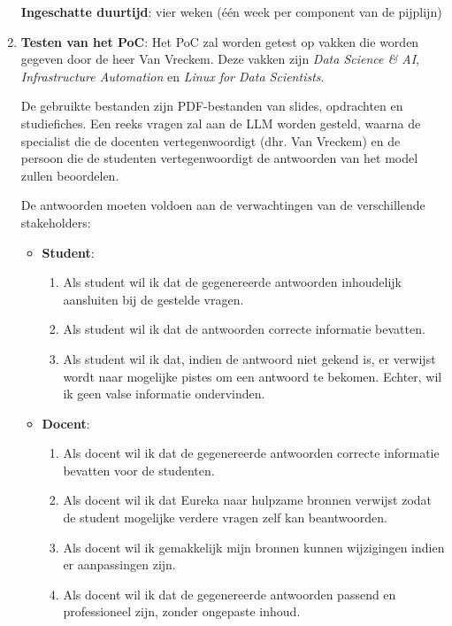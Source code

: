\begin{enumerate}
    \textbf{Ingeschatte duurtijd}: vier weken (één week per component van de pijplijn)
    
    \item \textbf{Testen van het PoC}: Het PoC zal worden getest op vakken die worden gegeven door de heer Van Vreckem. Deze vakken zijn \emph{Data Science \& AI}, \emph{Infrastructure Automation} en \emph{Linux for Data Scientists}.
    
    De gebruikte bestanden zijn PDF-bestanden van slides, opdrachten en studiefiches. Een reeks vragen zal aan de \acrshort{LLM} worden gesteld, waarna de specialist die de docenten vertegenwoordigt (dhr. Van Vreckem) en de persoon die de studenten vertegenwoordigt de antwoorden van het model zullen beoordelen.
    
    De antwoorden moeten voldoen aan de verwachtingen van de verschillende stakeholders:
    
    \begin{itemize} 
        \item \textbf{Student}:
        \begin{enumerate} 
            \item Als student wil ik dat de gegenereerde antwoorden inhoudelijk aansluiten bij de gestelde vragen.
            \item Als student wil ik dat de antwoorden correcte informatie bevatten. 
            \item Als student wil ik dat, indien de antwoord niet gekend is, er verwijst wordt naar mogelijke pistes om een antwoord te bekomen. Echter, wil ik geen valse informatie ondervinden.
        \end{enumerate}
        \item \textbf{Docent}:
        \begin{enumerate} 
            \item Als docent wil ik dat de gegenereerde antwoorden correcte informatie bevatten voor de studenten.
            \item Als docent wil ik dat Eureka naar hulpzame bronnen verwijst zodat de student mogelijke verdere vragen zelf kan beantwoorden. 
            \item Als docent wil ik gemakkelijk mijn bronnen kunnen wijzigingen indien er aanpassingen zijn.
            \item Als docent wil ik dat de gegenereerde antwoorden passend en professioneel zijn, zonder ongepaste inhoud.
        \end{enumerate}    
    \end{itemize}
    

\end{enumerate}

